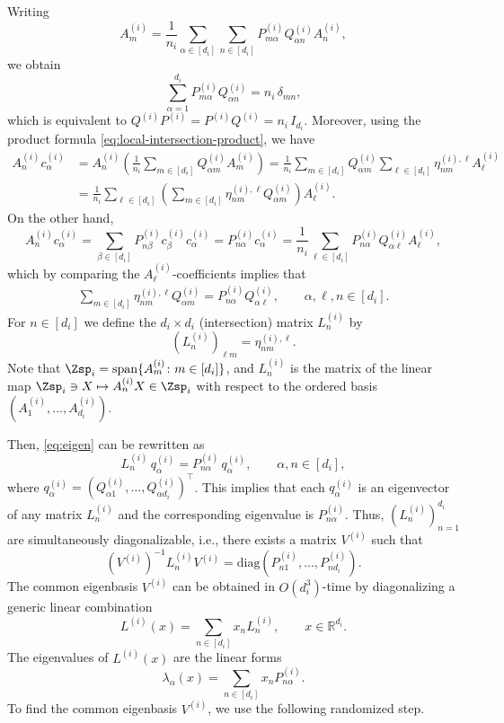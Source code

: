 \documentclass[12pt]{amsart}
\theoremstyle{plain}
\theoremstyle{definition}
\theoremstyle{remark}
\newcommand{\R}{\mathbb{R}}
\newcommand{\1}{\mathbf{1}}
\begin{document}
Writing
\[
A_m^{(i)} = \frac1{n_i}  \sum_{\alpha\in[d_i]} \sum_{n\in[d_i]} P_{m\alpha}^{(i)} Q_{\alpha n}^{(i)} A_n^{(i)},
\]
we obtain
\[
\sum_{\alpha=1}^{d_i} P_{m\alpha}^{(i)} Q_{\alpha n}^{(i)} = n_i \,\delta_{mn},
\]
which is equivalent to  $Q^{(i)} P^{(i)} = P^{(i)} Q^{(i)} = n_i \,I_{d_i}$. 
Moreover, using the product formula \eqref{eq:local-intersection-product}, we have
\begin{align*}
A_n^{(i)} c_\alpha^{(i)} &=  A_n^{(i)} \left(\frac1{n_i}\sum_{m\in[d_i]} Q_{\alpha m}^{(i)} A_m^{(i)}\right) = 
\frac1{n_i}\sum_{m\in[d_i]} Q_{\alpha m}^{(i)} \sum_{\ell\in[d_i]} \eta_{nm}^{(i),\ell} A_\ell^{(i)} \\
&=\frac1{n_i} \sum_{\ell\in[d_i]} \left(\sum_{m\in[d_i]} \eta_{nm}^{(i),\ell} Q_{\alpha m}^{(i)}\right) A_\ell^{(i)}.
\end{align*}
On the other hand,
\[
A_n^{(i)} c_\alpha^{(i)} = \sum_{\beta\in[d_i]} P_{n\beta}^{(i)}c_\beta^{(i)} c_\alpha^{(i)} =  P_{n\alpha}^{(i)}c_\alpha^{(i)} = \frac1{n_i}\sum_{\ell\in[d_i]} P_{n\alpha}^{(i)} Q_{\alpha \ell}^{(i)} A_\ell^{(i)}, 
\]
which by comparing the $A_\ell^{(i)}$-coefficients implies that 
\begin{align}\label{eq:eigen}
\sum_{m\in[d_i]} \eta_{nm}^{(i),\ell} Q_{\alpha m}^{(i)} = P_{n\alpha} ^{(i)}Q_{\alpha\ell}^{(i)},\qquad \alpha,\ell,n\in[d_i].
\end{align}
For $n\in [d_i]$ we define the $d_i\times d_i$ (intersection) matrix $L^{(i)}_n$ by
\[
(L^{(i)}_{n})_{\ell m} = \eta_{nm}^{(i),\ell}.
\]
Note that $\Zsp_i=\mathrm{span}\{A_m^{(i)}\colon m\in[d_i]\}$, and $L^{(i)}_n$ is the matrix of the linear map
$\Zsp_i\ni X\mapsto A_n^{(i)}X\in\Zsp_i$ with respect to the ordered basis
$(A_1^{(i)},\ldots,A_{d_i}^{(i)})$.

Then, \eqref{eq:eigen} can be rewritten as 
\[
L^{(i)}_n\, q_\alpha^{(i)} = P_{n\alpha}^{(i)}\, q_\alpha^{(i)},\qquad \alpha,n\in[d_i],
\]
where $q_\alpha^{(i)} = (Q_{\alpha1}^{(i)},\ldots,Q_{\alpha d_i}^{(i)})^\top$. This implies that each $q_\alpha^{(i)}$ is an eigenvector of any matrix $L^{(i)}_n$ and the corresponding eigenvalue is $P_{n\alpha}^{(i)}$. Thus, $(L^{(i)}_n)_{n=1}^{d_i}$ are simultaneously diagonalizable, i.e., there exists a matrix $V^{(i)}$ such that 
\[
(V^{(i)})^{-1} L^{(i)}_n V^{(i)} = \mathrm{diag}(P_{n1}^{(i)},\ldots,P_{nd_i}^{(i)}). 
\]
The common eigenbasis $V^{(i)}$ can be obtained in $O(d_i^3)$-time by diagonalizing a generic linear combination
\[
L^{(i)}(x) = \sum_{n\in[d_i]} x_n L^{(i)}_n,\qquad x\in \R^{d_i}. 
\]
The eigenvalues of 
$L^{(i)}(x)$ are the linear forms 
\[
\lambda_\alpha(x) = \sum_{n\in[d_i]} x_n P_{n\alpha}^{(i)}.
\]
To find the common eigenbasis $V^{(i)}$, we use the following randomized step.
\end{document}
